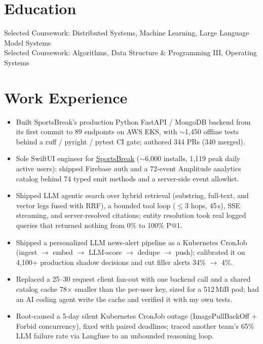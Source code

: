 \documentclass[11pt, letterpaper]{article}
\begin{document}

\section{Education}
Selected Coursework: Distributed Systems, Machine Learning, Large Language Model Systems\\[1pt]
Selected Coursework: Algorithms, Data Structure \& Programming III, Operating Systems

\section{Work Experience}
\begin{itemize}
  \item Built SportsBreak's production Python FastAPI / MongoDB backend from its first commit to 89 endpoints on AWS EKS, with $\sim$1{,}450 offline tests behind a ruff / pyright / pytest CI gate; authored 344 PRs (340 merged).
  \item Sole SwiftUI engineer for \href{https://apps.apple.com/app/id6762649287}{SportsBreak} ($\sim$6{,}000 installs, 1{,}119 peak daily active users); shipped Firebase auth and a 72-event Amplitude analytics catalog behind 74 typed emit methods and a server-side event allowlist.
  \item Shipped LLM agentic search over hybrid retrieval (substring, full-text, and vector legs fused with RRF), a bounded tool loop ($\le$3 hops, 45\,s), SSE streaming, and server-resolved citations; entity resolution took real logged queries that returned nothing from 0\% to 100\% P@1.
  \item Shipped a personalized LLM news-alert pipeline as a Kubernetes CronJob (ingest $\to$ embed $\to$ LLM-score $\to$ dedupe $\to$ push); calibrated it on 4{,}100+ production shadow decisions and cut filler alerts 34\% $\to$ 4\%.
  \item Replaced a 25--30 request client fan-out with one backend call and a shared catalog cache 78$\times$ smaller than the per-user key, sized for a 512\,MiB pod; had an AI coding agent write the cache and verified it with my own tests.
  \item Root-caused a 5-day silent Kubernetes CronJob outage (ImagePullBackOff + Forbid concurrency), fixed with paired deadlines; traced another team's 65\% LLM failure rate via Langfuse to an unbounded reasoning loop.
\end{itemize}
\end{document}
